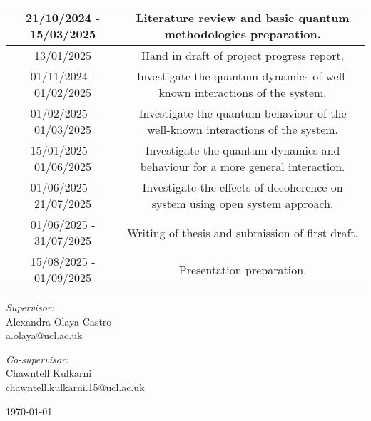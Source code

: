 \documentclass[a4, 12pt]{article}
\begin{document}
\begin{titlepage}
\begin{flushleft}
\begin{center}
\begin{tabular}{|c | c |}
\small 21/10/2024 - 15/03/2025 & \small Literature review and basic quantum methodologies preparation. \\ 
\hline
\small 13/01/2025 & \small Hand in draft of project progress report. \\  
\hline
\small 01/11/2024 - 01/02/2025 & \small Investigate the quantum dynamics of well-known interactions of the system.\\
 \hline
\small 01/02/2025 - 01/03/2025 & \small Investigate the quantum behaviour of the well-known interactions of the system. \\
 \hline
 \small 15/01/2025 - 01/06/2025 & \small Investigate the quantum dynamics and behaviour for a more general interaction. \\
 \hline
 \small 01/06/2025 - 21/07/2025 & \small Investigate the effects of decoherence on system using open system approach.\\
 \hline
 \small 01/06/2025 - 31/07/2025& \small Writing of thesis and submission of first draft. \\
 \hline
 \small 15/08/2025 - 01/09/2025 & \small Presentation preparation. \\ 
 \hline
\end{tabular}
\end{center}
    
\end{flushleft}


\vspace{0.5in}
\begin{flushleft}
    \begin{minipage}{0.48\textwidth}
        
        \textit{Supervisor:} \\
        Alexandra Olaya-Castro \\
        a.olaya@ucl.ac.uk \\
    
        \vspace{0.1in}
            
        \textit{Co-supervisor:}\\
        Chawntell Kulkarni\\
        chawntell.kulkarni.15@ucl.ac.uk
       
    \end{minipage}

\end{flushleft}




\today

\end{titlepage}
\end{document}
